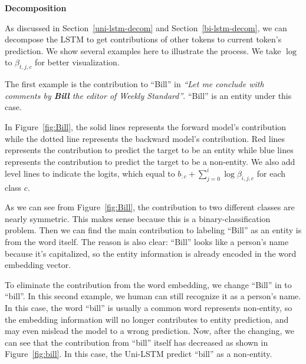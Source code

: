 \documentclass{article}
\begin{document}

\noindent \textbf{Decomposition}

As discussed in Section~\ref{uni-lstm-decom} and Section~\ref{bi-lstm-decom}, we can decompose the LSTM to get contributions of other tokens to current token's prediction. We show several examples here to illustrate the process. We take $\log$ to $\beta_{t,j,c}$ for better visualization.

The first example is the contribution to ``Bill'' in \textit{``Let me conclude with comments by \textbf{Bill} the editor of Weekly Standard''}. ``Bill'' is an entity under this case. 

In Figure~\ref{fig:Bill}, the solid lines represents the forward model's contribution while the dotted line represents the backward model's contribution.  Red lines represents the contribution to predict the target to be an entity while blue lines represents the contribution to predict the target to be a non-entity. We also add level lines to indicate the logits, which equal to $b_{:c} + \sum_{j=0}^{i} \log \beta_{i, j, c} $ for each class $c$.

As we can see from Figure~\ref{fig:Bill}, the contribution to two different classes are nearly symmetric. This makes sense because this is a binary-classification problem. Then we can find the main contribution to labeling ``Bill'' as an entity is from the word itself. The reason is also clear: ``Bill'' looks like a person's name because it's capitalized, so the entity information is already encoded in the word embedding vector. 

To eliminate the contribution from the word embedding, we change ``Bill'' in to ``bill''. In this second example, we human can still recognize it as a person's name. In this case, the word ``bill'' is usually a common word represents non-entity, so the embedding information will no longer contributes to entity prediction, and may even mislead the model to a wrong prediction. Now, after the changing, we can see that the contribution from ``bill'' itself has decreased as shown in Figure~\ref{fig:bill}. In this case, the Uni-LSTM predict ``bill'' as a non-entity. 
\end{document}
